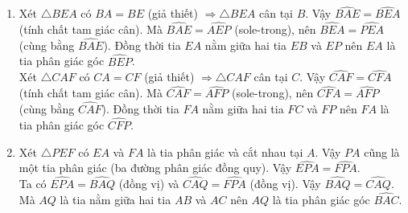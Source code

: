 \begin{bt}
{\begin{center}
		\end{center}
		\begin{enumerate}
			\item Xét $\triangle BEA$ có $BA=BE$ (giả thiết) $\Rightarrow \triangle BEA$ cân tại $B$. Vậy $\widehat{BAE}=\widehat{BEA}$ (tính chất tam giác cân). Mà $\widehat{BAE}=\widehat{AEP}$ (sole-trong), nên $\widehat{BEA}=\widehat{PEA}$ (cùng bằng $\widehat{BAE}$). Đồng thời tia $EA$ nằm giữa hai tia $EB$ và $EP$ nên $EA$ là tia phân giác góc $\widehat{BEP}$.\\
			Xét $\triangle CAF$ có $CA=CF$ (giả thiết) $\Rightarrow \triangle CAF$ cân tại $C$. Vậy $\widehat{CAF}=\widehat{CFA}$ (tính chất tam giác cân). Mà $\widehat{CAF}=\widehat{AFP}$ (sole-trong), nên $\widehat{CFA}=\widehat{AFP}$ (cùng bằng $\widehat{CAF}$). Đồng thời tia $FA$ nằm giữa hai tia $FC$ và $FP$ nên $FA$ là tia phân giác góc $\widehat{CFP}$.\\
			\item Xét $\triangle PEF$ có $EA$ và $FA$ là tia phân giác và cắt nhau tại $A$. Vậy $PA$ cũng là một tia phân giác (ba đường phân giác đồng quy). Vậy $\widehat{EPA}=\widehat{FPA}$.\\
			Ta có $\widehat{EPA}=\widehat{BAQ}$ (đồng vị) và $\widehat{CAQ}=\widehat{FPA}$ (đồng vị). Vậy $\widehat{BAQ}=\widehat{CAQ}$. Mà $AQ$ là tia nằm giữa hai tia $AB$ và $AC$ nên $AQ$ là tia phân giác góc $\widehat{BAC}$.
		\end{enumerate}
	}
\end{bt}

